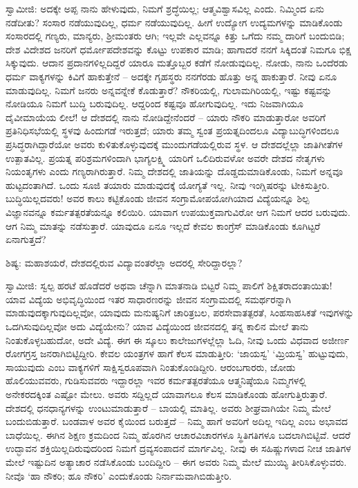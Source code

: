 ಸ್ವಾಮೀಜಿ: ಅದಕ್ಕೇ ಅಪ್ಪ ನಾನು ಹೇಳುವುದು, ನಿಮಗೆ ಶ್ರದ್ಧೆಯಿಲ್ಲ; ಆತ್ಮವಿಶ್ವಾಸವಿಲ್ಲ ಎಂದು. ನಿಮ್ಮಿಂದ ಏನು ನಡೆದೀತು? ಸಂಸಾರ ನಡೆಯುವುದಿಲ್ಲ, ಧರ್ಮ ನಡೆಯುವುದಿಲ್ಲ. ಹೀಗೆ ಉದ್ಯೋಗ ಉದ್ಯಮಗಳನ್ನು ಮಾಡಿಕೊಂಡು ಸಂಸಾರದಲ್ಲಿ ಗಣ್ಯರು, ಮಾನ್ಯರು, ಶ‍್ರೀಮಂತರು ಆಗಿ; ಇಲ್ಲವೇ ಎಲ್ಲವನ್ನೂ ಕಿತ್ತು ಒಗೆದು ನಮ್ಮ ದಾರಿಗೆ ಬಂದುಬಿಡಿ; ದೇಶ ವಿದೇಶದ ಜನರಿಗೆ ಧರ್ಮೋಪದೇಶವನ್ನು ಕೊಟ್ಟು ಉಪಕಾರ ಮಾಡಿ; ಹಾಗಾದರೆ ನನಗೆ ಸಿಕ್ಕಿದಂತೆ ನಿಮಗೂ ಭಿಕ್ಷ ಸಿಕ್ಕುವುದು. ಆದಾನ ಪ್ರದಾನಗಳಿಲ್ಲದಿದ್ದರೆ ಯಾರೂ ಮತ್ತೊಬ್ಬರ ಕಡೆಗೆ ನೋಡುವುದಿಲ್ಲ. ನೋಡು, ನಾನು ಒಂದೆರಡು ಧರ್ಮ ವಾಕ್ಯಗಳನ್ನು ಕಿವಿಗೆ ಹಾಕುತ್ತೇನೆ – ಅದಕ್ಕೇ ಗೃಹಸ್ಥರು ನನಗೆರಡು ಹೊತ್ತು ಅನ್ನ ಹಾಕುತ್ತಾರೆ. ನೀವು ಏನೂ ಮಾಡುವುದಿಲ್ಲ. ನಿಮಗೆ ಜನರು ಅನ್ನವನ್ನೇಕೆ ಕೊಡುತ್ತಾರೆ? ನೌಕರಿಯಲ್ಲಿ, ಗುಲಾಮಗಿರಿಯಲ್ಲಿ, ಇಷ್ಟು ಕಷ್ಟವನ್ನು ನೋಡಿಯೂ ನಿಮಗೆ ಬುದ್ಧಿ ಬರುವುದಿಲ್ಲ. ಆದ್ದರಿಂದ ಕಷ್ಟವೂ ಹೋಗುವುದಿಲ್ಲ. ಇದು ನಿಜವಾಗಿಯೂ ದೈವೀಮಾಯೆಯ ಲೀಲೆ! ಆ ದೇಶದಲ್ಲಿ ನಾನು ನೋಡಿದ್ದೇನೆಂದರೆ – ಯಾರು ನೌಕರಿ ಮಾಡುತ್ತಾರೋ ಅವರಿಗೆ ಪ್ರತಿನಿಧಿಸಭೆಯಲ್ಲಿ ಸ್ಥಳವು ಹಿಂದುಗಡೆ ಇರುತ್ತದೆ; ಯಾರು ತಮ್ಮ ಸ್ವಂತ ಪ್ರಯತ್ನದಿಂದಲೂ ವಿದ್ಯಾಬುದ್ಧಿಗಳಿಂದಲೂ ಪ್ರಸಿದ್ಧರಾಗಿದ್ದಾರೆಯೋ ಅವರು ಕುಳಿತುಕೊಳ್ಳುವುದಕ್ಕೆ ಮುಂದುಗಡೆಯಲ್ಲಿರುವ ಸ್ಥಳ. ಆ ದೇಶದಲ್ಲೆಲ್ಲಾ ಜಾತಿಗೀತೆಗಳ ಉತ್ಪಾತವಿಲ್ಲ. ಪ್ರಯತ್ನ ಪರಿಶ್ರಮಗಳಿಂದಾಗಿ ಭಾಗ್ಯಲಕ್ಷ್ಮಿ ಯಾರಿಗೆ ಒಲಿದಿರುವಳೋ ಅವರೇ ದೇಶದ ನೇತೃಗಳು ನಿಯಂತೃಗಳು ಎಂದು ಗಣ್ಯರಾಗಿರುತ್ತಾರೆ. ನಿಮ್ಮ ದೇಶದಲ್ಲಿ ಜಾತಿಯನ್ನು ದೊಡ್ಡದುಮಾಡಿಕೊಂಡು, ನಿಮಗೆ ಅನ್ನವೂ ಹುಟ್ಟದಂತಾಗಿದೆ. ಒಂದು ಸೂಜಿ ತಯಾರು ಮಾಡುವುದಕ್ಕೆ ಯೋಗ್ಯತೆ ಇಲ್ಲ. ನೀವು ಇಂಗ್ಲಿಷರನ್ನು ಟೀಕಿಸುತ್ತೀರಿ. ಬುದ್ಧಿಯಿಲ್ಲದವರು! ಅವರ ಕಾಲು ಕಟ್ಟಿಕೊಂಡು ಜೀವನ ಸಂಗ್ರಾಮೋಪಯೋಗಿಯಾದ ವಿದ್ಯೆಯನ್ನೂ ಶಿಲ್ಪ ವಿಜ್ಞಾನವನ್ನೂ ಕರ್ಮತತ್ಪರತೆಯನ್ನೂ ಕಲಿಯಿರಿ. ಯಾವಾಗ ಉಪಯುಕ್ತವಾಗುವಿರೋ ಆಗ ನಿಮಗೆ ಆದರ ಬರುವುದು. ಆಗ ನಿಮ್ಮ ಮಾತನ್ನು ನಡೆಸುತ್ತಾರೆ. ಯಾವುದೂ ಏನೂ ಇಲ್ಲದೆ ಕೇವಲ ಕಾಂಗ್ರೆಸ್ ಮಾಡಿಕೊಂಡು ಕೂಗಿಟ್ಟರೆ ಏನಾಗುತ್ತದೆ?

ಶಿಷ್ಯ: ಮಹಾಶಯರೆ, ದೇಶದಲ್ಲಿರುವ ವಿದ್ಯಾವಂತರೆಲ್ಲಾ ಅದರಲ್ಲಿ ಸೇರಿದ್ದಾರಲ್ಲಾ?

ಸ್ವಾಮೀಜಿ: ಸ್ವಲ್ಪ ಹರಟೆ ಹೊಡೆದರೆ ಅಥವಾ ಚೆನ್ನಾಗಿ ಮಾತನಾಡಿ ಬಿಟ್ಟರೆ ನಿಮ್ಮ ಪಾಲಿಗೆ ಶಿಕ್ಷಿತರಾದಂತಾಯಿತು! ಯಾವ ವಿದ್ಯೆಯ ಅಭಿವೃದ್ಧಿಯಿಂದ ಇತರ ಸಾಧಾರಣರನ್ನು ಜೀವನ ಸಂಗ್ರಾಮದಲ್ಲಿ ಸಮರ್ಥರನ್ನಾಗಿ ಮಾಡುವುದಕ್ಕಾಗುವುದಿಲ್ಲವೋ, ಯಾವುದು ಮನುಷ್ಯನಿಗೆ ಚಾರಿತ್ರಬಲ, ಪರಸೇವಾತತ್ಪರತೆ, ಸಿಂಹಸಾಹಸಿಕತೆ ಇವುಗಳನ್ನು ಒದಗಿಸುವುದಿಲ್ಲವೋ ಅದು ವಿದ್ಯೆಯೇನು? ಯಾವ ವಿದ್ಯೆಯಿಂದ ಜೀವನದಲ್ಲಿ ತನ್ನ ಕಾಲಿನ ಮೇಲೆ ತಾನು ನಿಂತುಕೊಳ್ಳಬಹುದೋ, ಅದೇ ವಿದ್ಯೆ. ಈಗ ಈ ಸ್ಕೂಲು ಕಾಲೇಜುಗಳಲ್ಲೆಲ್ಲಾ ಓದಿ, ನೀವು ಒಂದು ವಿಧವಾದ ಅಜೀರ್ಣ ರೋಗಗ್ರಸ್ತ ಜನರಾಗಿಬಿಟ್ಟಿದ್ದೀರಿ. ಕೇವಲ ಯಂತ್ರಗಳ ಹಾಗೆ ಕೆಲಸ ಮಾಡುತ್ತೀರಿ: ‘ಜಾಯಸ್ವ’ ‘ಮ್ರಿಯಸ್ವ’ ಹುಟ್ಟುವುದು, ಸಾಯುವುದು ಎಂಬ ವಾಕ್ಯಗಳಿಗೆ ಸಾಕ್ಷಿಸ್ವರೂಪವಾಗಿ ನಿಂತುಕೊಂಡಿದ್ದೀರಿ. ಆರಂಬಗಾರರು, ಜೋಡು ಹೊಲಿಯುವವರು, ಗುಡಿಸುವವರು ಇದ್ದಾರಲ್ಲಾ ಇವರ ಕರ್ಮತತ್ಪರತೆಯೂ ಆತ್ಮನಿಷ್ಠೆಯೂ ನಿಮ್ಮಗಳಲ್ಲಿ ಅನೇಕರದಕ್ಕಿಂತ ಎಷ್ಟೋ ಮೇಲು. ಅವರು ಸದ್ದಿಲ್ಲದೆ ಯಾವಾಗಲೂ ಕೆಲಸ ಮಾಡಿಕೊಂಡು ಹೋಗುತ್ತಿರುತ್ತಾರೆ. ದೇಶದಲ್ಲಿ ಧನಧಾನ್ಯಗಳನ್ನು ಉಂಟುಮಾಡುತ್ತಾರೆ – ಬಾಯಲ್ಲಿ ಮಾತಿಲ್ಲ. ಅವರು ಶೀಘ್ರವಾಗಿಯೇ ನಿಮ್ಮ ಮೇಲೆ ಬಂದುಬಿಡುತ್ತಾರೆ. ಬಂಡವಾಳ ಅವರ ಕೈಯಿಂದ ಬರುತ್ತದೆ – ನಿಮ್ಮ ಹಾಗೆ ಅವರಿಗೆ ಅದಿಲ್ಲ ಇದಿಲ್ಲ ಎಂಬ ಅಭಾವದ ಬಾಧೆಯಿಲ್ಲ. ಈಗಿನ ಶಿಕ್ಷಣ ಕ್ರಮದಿಂದ ನಿಮ್ಮ ಹೊರಗಿನ ಆಚಾರವಿಚಾರಗಳೂ ಸ್ಥಿತಿಗತಿಗಳೂ ಬದಲಾಗಿಬಿಟ್ಟಿವೆ. ಆದರೆ ಉದ್ಭಾವನ ಶಕ್ತಿಯಿಲ್ಲದಿರುವುದರಿಂದ ನಿಮಗೆ ದ್ರವ್ಯಸಂಪಾದನೆ ಮಾರ್ಗವಿಲ್ಲ. ನೀವು ಈ ಸಹಿಷ್ಣುಗಳಾದ ನೀಚ ಜಾತಿಗಳ ಮೇಲೆ ಇಷ್ಟುದಿನ ಅತ್ಯಾಚಾರ ನಡೆಸಿಕೊಂಡು ಬಂದಿದ್ದೀರಿ – ಈಗ ಅವರು ನಿಮ್ಮ ಮೇಲೆ ಮುಯ್ಯಿ ತೀರಿಸಿಕೊಳ್ಳುವರು. ನೀವೊ ‘ಹಾ ನೌಕರಿ; ಹೂ ನೌಕರಿ’ ಎಂದುಕೊಂಡು ನಿರ್ನಾಮವಾಗಿಬಿಡುತ್ತೀರಿ.

